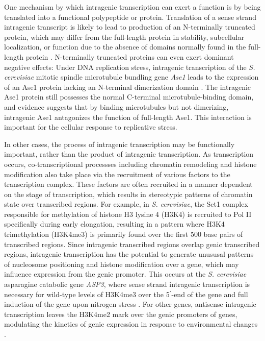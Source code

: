 One mechanism by which intragenic transcription can exert a function is by being translated into a functional polypeptide or protein.
Translation of a sense strand intragenic transcript is likely to lead to production of an N-terminally truncated protein, which may differ from the full-length protein in stability, subcellular localization, or function due to the absence of domains normally found in the full-length protein \citep{benanti2009, gammie1999, mcknight2014}.
N-terminally truncated proteins can even exert dominant negative effects: Under DNA replication stress, intragenic transcription of the \textit{S. cerevisiae} mitotic spindle microtubule bundling gene \textit{Ase1} leads to the expression of an Ase1 protein lacking an N-terminal dimerization domain \citep{mcknight2014}.
The intragenic Ase1 protein still possesses the normal C-terminal microtubule-binding domain, and evidence suggests that by binding microtubules but not dimerizing, intragenic Ase1 antagonizes the function of full-length Ase1.
This interaction is important for the cellular response to replicative stress.

In other cases, the process of intragenic transcription may be functionally important, rather than the product of intragenic transcription.
As transcription occurs, co-transcriptional processses including chromatin remodeling and histone modification also take place via the recruitment of various factors to the transcription complex.
These factors are often recruited in a manner dependent on the stage of transcription, which results in stereotypic patterns of chromatin state over transcribed regions.
For example, in \textit{S. cerevisiae}, the Set1 complex responsible for methylation of histone H3 lysine 4 (H3K4) is recruited to Pol II specifically during early elongation, resulting in a pattern where H3K4 trimethylation (H3K4me3) is primarily found over the first 500 base pairs of transcribed regions.
Since intragenic transcribed regions overlap genic transcribed regions, intragenic transcription has the potential to generate unususal patterns of nucleosome positioning and histone modification over a gene, which may influence expression from the genic promoter.
This occurs at the \textit{S. cerevisiae} asparagine catabolic gene \textit{ASP3}, where sense strand intragenic transcription is necessary for wild-type levels of H3K4me3 over the 5$^\prime$-end of the gene and full induction of the gene upon nitrogen stress \citep{huang2010}.
For other genes, antisense intragenic transcription leaves the H3K4me2 mark over the genic promoters of genes, modulating the kinetics of genic expression in response to environmental changes \citep{kim2012}.

